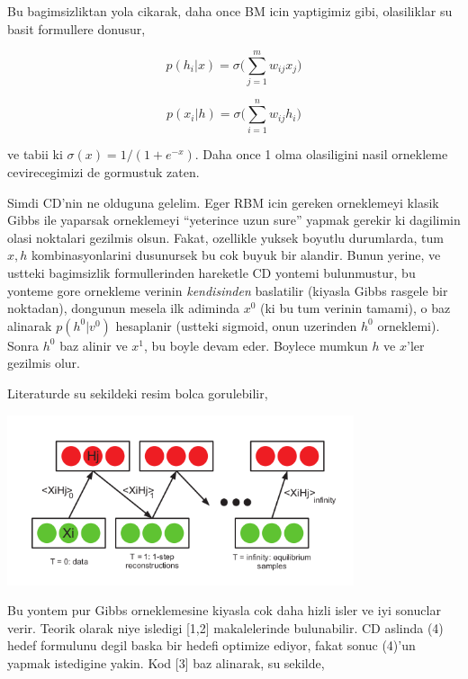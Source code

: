 \documentclass[12pt,fleqn]{article}\usepackage{../common}
\begin{document}
Bu bagimsizliktan yola cikarak, daha once BM icin yaptigimiz gibi,
olasiliklar su basit formullere donusur,

$$ p(h_i|x) = \sigma \bigg( \sum _{j=1}^{m} w_{ij} x_j \bigg) $$

$$ p(x_i|h) = \sigma \bigg( \sum _{i=1}^{n} w_{ij} h_i \bigg) $$

ve tabii ki $\sigma(x) = 1 / (1+e^{-x})$. Daha once 1 olma olasiligini
nasil ornekleme cevirecegimizi de gormustuk zaten. 

Simdi CD'nin ne olduguna gelelim. Eger RBM icin gereken orneklemeyi klasik
Gibbs ile yaparsak orneklemeyi ``yeterince uzun sure'' yapmak gerekir ki
dagilimin olasi noktalari gezilmis olsun. Fakat, ozellikle yuksek boyutlu
durumlarda, tum $x,h$ kombinasyonlarini dusunursek bu cok buyuk bir
alandir. Bunun yerine, ve ustteki bagimsizlik formullerinden hareketle CD
yontemi bulunmustur, bu yonteme gore ornekleme verinin {\em kendisinden}
baslatilir (kiyasla Gibbs rasgele bir noktadan), dongunun mesela ilk
adiminda $x^0$ (ki bu tum verinin tamami), o baz alinarak $p(h^0|v^0)$
hesaplanir (ustteki sigmoid, onun uzerinden $h^0$ orneklemi). Sonra $h^0$
baz alinir ve $x^1$, bu boyle devam eder. Boylece mumkun $h$ ve $x$'ler
gezilmis olur. 

Literaturde su sekildeki resim bolca gorulebilir,

\includegraphics[height=5cm]{rbm_03.png}

Bu yontem pur Gibbs orneklemesine kiyasla cok daha hizli isler ve iyi
sonuclar verir. Teorik olarak niye isledigi [1,2] makalelerinde
bulunabilir. CD aslinda (4) hedef formulunu degil baska bir hedefi optimize
ediyor, fakat sonuc (4)'un yapmak istedigine yakin. Kod [3] baz alinarak,
su sekilde,

\inputminted[fontsize=\footnotesize]{python}{rbm.py}







\inputminted[fontsize=\footnotesize]{python}{test_rbmkfold.py}
\end{document}

